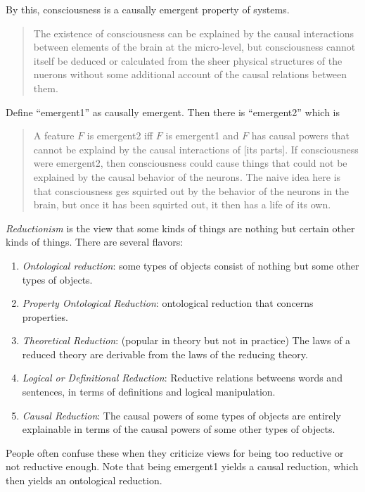 \documentclass{article}
\newcommand{\ti}[1]{\textit{#1}}
\begin{document}
By this, consciousness is a causally emergent property of systems.
\begin{quote}
The existence of consciousness can be explained by the causal interactions between elements of the brain at the micro-level, but consciousness cannot itself be deduced or calculated from the sheer physical structures of the nuerons without some additional account of the causal relations between them.
\end{quote}

Define ``emergent1'' as causally emergent. Then there is ``emergent2'' which is

\begin{quote}
A feature $F$ is emergent2 iff $F$ is emergent1 and $F$ has causal powers that cannot be explaind by the causal interactions of [its parts]. If consciousness were emergent2, then consciousness could cause things that could not be explained by the causal behavior of the neurons. The naive idea here is that consciousness ges squirted out by the behavior of the neurons in the brain, but once it has been squirted out, it then has a life of its own.
\end{quote}

\ti{Reductionism} is the view that some kinds of things are nothing but certain other kinds of things. There are several flavors:
\begin{enumerate}
    \item \ti{Ontological reduction}: some types of objects consist of nothing but some other types of objects.
    \item \ti{Property Ontological Reduction}: ontological reduction that concerns properties.
    \item \ti{Theoretical Reduction}: (popular in theory but not in practice) The laws of a reduced theory are derivable from the laws of the reducing theory.
    \item \ti{Logical or Definitional Reduction}: Reductive relations betweens words and sentences, in terms of definitions and logical manipulation.
    \item \ti{Causal Reduction}: The causal powers of some types of objects are entirely explainable in terms of the causal powers of some other types of objects.
\end{enumerate}

People often confuse these when they criticize views for being too reductive or not reductive enough. Note that being emergent1 yields a causal reduction, which then yields an ontological reduction.
\end{document}
